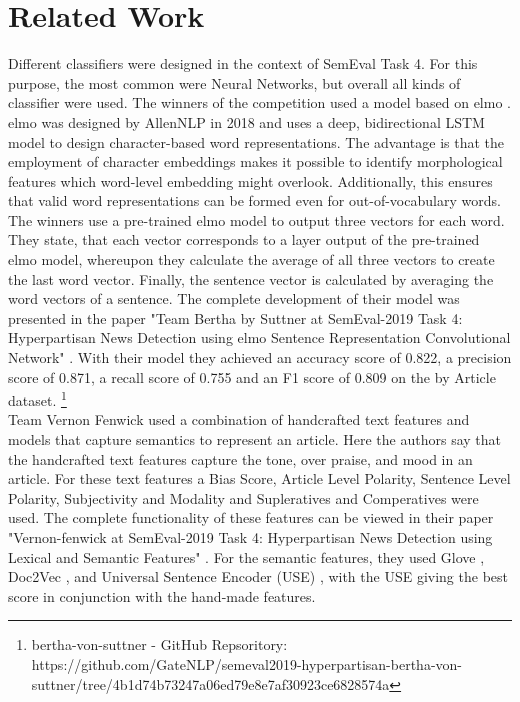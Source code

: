 \documentclass[a4paper, 11pt,titlepage,oneside,openany]{book}
\begin{document}
\chapter{Related Work}
Different classifiers were designed in the context of SemEval Task 4. For this purpose, the most common were Neural Networks, but overall all kinds of classifier were used. 
\indent The winners of the competition used a model based on \gls{elmo} \cite{elmo}. \gls{elmo} was designed by AllenNLP in 2018 and uses a deep, bidirectional LSTM model to design character-based word representations. The advantage is that the employment of character embeddings makes it possible to identify morphological features which word-level embedding might overlook. Additionally, this ensures that valid word representations can be formed even for out-of-vocabulary words. The winners use a pre-trained \gls{elmo} model to output three vectors for each word. They state, that each vector corresponds to a layer output of the pre-trained \gls{elmo} model, whereupon they calculate the average of all three vectors to create the last word vector. Finally, the sentence vector is calculated by averaging the word vectors of a sentence. The complete development of their model was presented in the paper "Team Bertha by Suttner at SemEval-2019 Task 4: Hyperpartisan News Detection using \gls{elmo} Sentence Representation Convolutional Network" \cite{gewinner}. With their model they achieved an accuracy score of 0.822, a precision score of 0.871, a recall score of 0.755 and an F1 score of 0.809 on the by Article dataset. \footnote{bertha-von-suttner - GitHub Repsoritory: https://github.com/GateNLP/semeval2019-hyperpartisan-bertha-von-suttner/tree/4b1d74b73247a06ed79e8e7af30923ce6828574a} \\
\indent Team Vernon Fenwick used a combination of handcrafted text features and models that capture semantics to represent an article. Here the authors say that the handcrafted text features capture the tone, over praise, and mood in an article. For these text features a Bias Score, Article Level Polarity, Sentence Level Polarity, Subjectivity and Modality and Supleratives and Comperatives were used. The complete functionality of these features can be viewed in their paper "Vernon-fenwick at SemEval-2019 Task 4: Hyperpartisan News Detection using Lexical and Semantic Features" \cite{vernon}. For the semantic features, they used Glove \cite{glove}, Doc2Vec \cite{doc2vec}, and Universal Sentence Encoder (USE) \cite{use}, with the USE giving the best score in conjunction with the hand-made features. 
\end{document}
